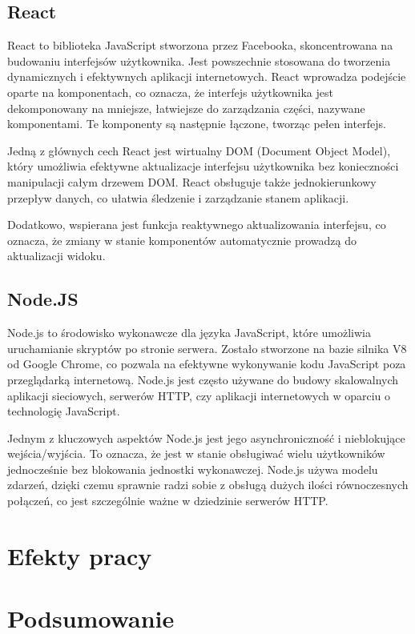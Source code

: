 \documentclass[12pt,twoside]{article}
\begin{document}
\subsection{React}
React to biblioteka JavaScript stworzona przez Facebooka, skoncentrowana na budowaniu interfejsów użytkownika. Jest powszechnie stosowana do tworzenia dynamicznych i efektywnych aplikacji internetowych. React wprowadza podejście oparte na komponentach, co oznacza, że interfejs użytkownika jest dekomponowany na mniejsze, łatwiejsze do zarządzania części, nazywane komponentami. Te komponenty są następnie łączone, tworząc pełen interfejs.

Jedną z głównych cech React jest wirtualny DOM (Document Object Model), który umożliwia efektywne aktualizacje interfejsu użytkownika bez konieczności manipulacji całym drzewem DOM. React obsługuje także jednokierunkowy przepływ danych, co ułatwia śledzenie i zarządzanie stanem aplikacji.

Dodatkowo, wspierana jest funkcja reaktywnego aktualizowania interfejsu, co oznacza, że zmiany w stanie komponentów automatycznie prowadzą do aktualizacji widoku.

\subsection{Node.JS}

Node.js to środowisko wykonawcze dla języka JavaScript, które umożliwia uruchamianie skryptów po stronie serwera. Zostało stworzone na bazie silnika V8 od Google Chrome, co pozwala na efektywne wykonywanie kodu JavaScript poza przeglądarką internetową. Node.js jest często używane do budowy skalowalnych aplikacji sieciowych, serwerów HTTP, czy aplikacji internetowych w oparciu o technologię JavaScript.

Jednym z kluczowych aspektów Node.js jest jego asynchroniczność i nieblokujące wejścia/wyjścia. To oznacza, że jest w stanie obsługiwać wielu użytkowników jednocześnie bez blokowania jednostki wykonawczej. Node.js używa modelu zdarzeń, dzięki czemu sprawnie radzi sobie z obsługą dużych ilości równoczesnych połączeń, co jest szczególnie ważne w dziedzinie serwerów HTTP.
\newpage

\section{Efekty pracy}
\section{Podsumowanie}
\end{document}
